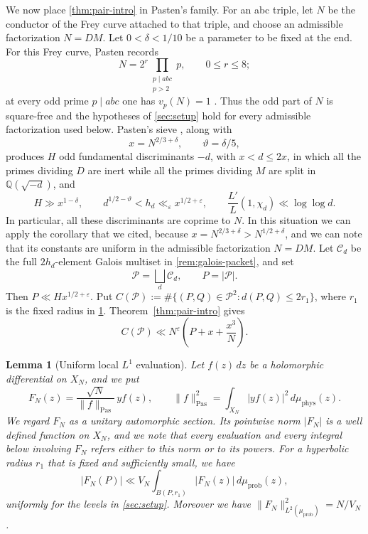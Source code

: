 \documentclass[11pt,reqno]{amsart}
\newtheorem{lemma}[theorem]{Lemma}
\theoremstyle{definition}
\newcommand{\Q}{\mathbb Q}
\newcommand{\eps}{\varepsilon}
\begin{document}
We now place \cref{thm:pair-intro} in Pasten's family. For an abc triple,
let $N$ be the conductor of the Frey curve attached to that triple, and
choose an admissible factorization $N=DM$. Let $0<\delta<1/10$ be a
parameter to be fixed at the end.  For this Frey curve, Pasten records
\[
 N=2^r\prod_{\substack{p\mid abc\\p>2}}p,
 \qquad 0\leq r\leq8;
\]
at every odd prime $p\mid abc$ one has $v_p(N)=1$
\cite[Section 3 and proof of Theorem 16.8]{Pasten}.  Thus the odd part of
$N$ is square-free and the hypotheses of \cref{sec:setup} hold for every
admissible factorization used below.  Pasten's sieve \cite[Theorem 11.1 and
Corollary 11.2]{Pasten}, along with
\begin{equation}\label{eq:parameters}
 x=N^{2/3+\delta},\qquad \vartheta=\delta/5,
\end{equation}
produces $H$ odd fundamental discriminants $-d$, with $x<d\leq2x$, in which
all the primes dividing $D$ are inert while all the primes dividing $M$ are
split in $\Q(\sqrt{-d})$, and
\begin{equation}\label{eq:sieve}
 H\gg x^{1-\delta},\qquad
 d^{1/2-\vartheta}<h_d\ll_\eps x^{1/2+\eps},\qquad
 \frac{L'}L(1,\chi_d)\ll\log\log d.
\end{equation}
In particular, all these discriminants are coprime to $N$.  In this situation we can apply the corollary that we cited, because
$x=N^{2/3+\delta}>N^{1/2+\delta}$, and we can note that
its constants are uniform in the admissible factorization $N=DM$.  Let $\mathscr C_d$ be the
full $2h_d$-element Galois multiset in
\cref{rem:galois-packet}, and set
\[
 \mathscr P=\bigsqcup_d\mathscr C_d,\qquad P=|\mathscr P|.
\]
Then $P\ll Hx^{1/2+\eps}$.  Put
$C(\mathscr P):=\#\{(P,Q)\in\mathscr P^2:d(P,Q)\leq2r_1\}$, where $r_1$ is
the fixed radius in \cref{lem:local-l1}.  Theorem~\ref{thm:pair-intro} gives
\begin{equation}\label{eq:pair-pasten}
 C(\mathscr P)\ll N^\eps\left(P+x+\frac{x^3}{N}\right).
\end{equation} \begin{lemma}[Uniform local $L^1$
evaluation]\label{lem:local-l1} Let $f(z)\,dz$ be a holomorphic differential
on $X_N$, and we put
\[
 F_N(z)=\frac{\sqrt N}{\|f\|_{\mathrm{Pas}}}\,y f(z),
 \qquad
 \|f\|_{\mathrm{Pas}}^2=
 \int_{X_N}|yf(z)|^2\,d\mu_{\mathrm{phys}}(z).
\]
We regard $F_N$ as a unitary automorphic section.  Its pointwise norm $|F_N|$ is a well defined function on $X_N$, and we note
that every evaluation and every integral below involving $F_N$ refers either
to this norm or to its powers.
For a hyperbolic radius $r_1$ that is fixed and sufficiently small, we have
\[
 |F_N(P)|\ll V_N\int_{B(P,r_1)}|F_N(z)|\,d\mu_{\mathrm{prob}}(z),
\]
uniformly for the levels in \cref{sec:setup}.  Moreover
we have $\|F_N\|_{L^2(\mu_{\mathrm{prob}})}^2=N/V_N$.
\end{lemma}
\end{document}
